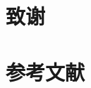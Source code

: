 \documentclass[final,5p]{elsarticle}
\begin{document}

\section*{致谢} \label{acknowledgements}




\section*{参考文献} \label{references}


\end{document}
